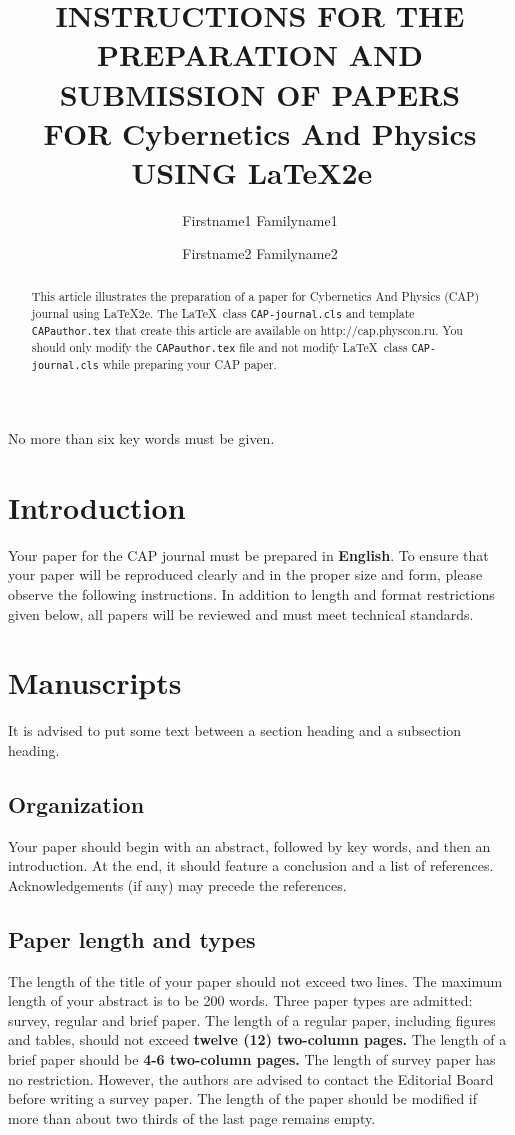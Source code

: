 \documentclass[twocolumn]{CAP-journal}
\title{INSTRUCTIONS FOR THE PREPARATION AND SUBMISSION OF PAPERS \\
FOR Cybernetics And Physics USING \LaTeX2e\ }
\author{ \twlsfb Firstname1 Familyname1
    \affiliation{
      Department1\\
      University1\\
      Country1\\
      name1@university1.country1
    }
    \and \twlsfb Firstname2 Familyname2
    \affiliation{
      Department2\\
      University2\\
      Country2\\
      name2@university2.country2
    }
}
\begin{document}
\maketitle


\begin{abstract}
This article illustrates the preparation of a paper for Cybernetics And Physics (CAP) journal
using \LaTeX2e. The \LaTeX\ class \verb+CAP-journal.cls+ and
template \verb+CAPauthor.tex+ that create this article are
available on http://cap.physcon.ru. You should
only modify the \verb+CAPauthor.tex+ file and not modify \LaTeX\
class \verb+CAP-journal.cls+ while preparing your CAP paper.
\end{abstract}


\begin{keywords}
 No more than six key words must be given.
\end{keywords}


\section{Introduction}
Your paper for the CAP journal  must be prepared in
\textbf{English}. To ensure that your paper will be reproduced
clearly and in the proper size and form, please observe the
following instructions. In addition to length and format
restrictions given below, all papers will be reviewed
and must meet technical standards.


\section{Manuscripts}
It is advised to put some text between a section heading and a subsection heading.

\subsection{Organization}
Your paper should begin with an abstract, followed by key words, and then an introduction. At the end, it should
feature a conclusion and a list of references. Acknowledgements (if any) may precede the references.

\subsection{Paper length and types}
The length of the title of your paper should not exceed two lines.
The maximum length of your abstract is to be 200 words. Three paper types are admitted: survey,
regular and brief paper.  The length of a regular paper,
including figures and tables, should not exceed \textbf{twelve (12) two-column pages.}
 The length of a brief paper
 should be \textbf{4-6 two-column pages.} The length of survey paper has no restriction.
 However, the authors are advised to contact the Editorial Board before writing a survey paper.
The length of the paper should be modified if more than about two thirds of the last page remains empty.
\end{document}
